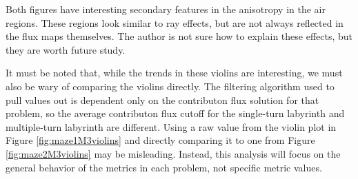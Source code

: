 Both figures have interesting secondary features in the anisotropy in the air
regions. These regions look similar to ray effects, but are not always reflected
in the flux maps themselves. The author is not sure how to explain these
effects, but they are worth future study.

It must be noted that, while
the trends in these violins are interesting, we must also be wary of comparing
the violins directly. The filtering algorithm used to pull values out is dependent only
on the contributon flux solution for that problem, so the average contributon
flux cutoff for the single-turn labyrinth and multiple-turn labyrinth are
different. Using a raw value from the violin plot in Figure
\ref{fig:maze1M3violins} and directly comparing it to one from Figure
\ref{fig:maze2M3violins} may be misleading. Instead, this analysis will focus on
the general behavior of the metrics in each problem, not specific metric values.

